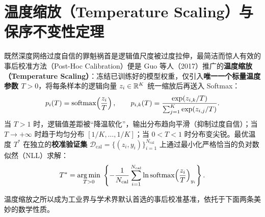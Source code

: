 \section{温度缩放（Temperature Scaling）与保序不变性定理}

既然深度网络过度自信的罪魁祸首是逻辑值尺度被过度拉伸，最简洁而惊人有效的事后校准方法（Post-Hoc Calibration）便是 Guo 等人（2017）推广的\textbf{温度缩放（Temperature Scaling）}：冻结已训练好的模型权重，仅引入\textbf{唯一一个标量温度参数 $T > 0$}，将每条样本的逻辑向量 $z_i \in \mathbb{R}^K$ 统一缩放后再送入 Softmax：
\begin{equation}\label{eq:temp-scaling}
  p_i(T) = \operatorname{softmax}\!\left(\frac{z_i}{T}\right),
  \qquad
  p_{i,k}(T) = \frac{\exp(z_{i,k} / T)}{\sum_{j=1}^K \exp(z_{i,j} / T)}.
\end{equation}
当 $T > 1$ 时，逻辑值差距被“降温软化”，输出分布趋向平滑（抑制过度自信）；当 $T \to +\infty$ 时趋于均匀分布 $[1/K,\dots,1/K]$；当 $0 < T < 1$ 时分布变尖锐。最优温度 $T^*$ 在独立的\textbf{校准验证集} $\mathcal{D}_{\text{cal}} = \{(z_i, y_i)\}_{i=1}^{N_{\text{cal}}}$ 上通过最小化严格恰当的负对数似然（NLL）求解：
\begin{equation}\label{eq:temp-opt}
  T^* = \operatorname*{arg\,min}_{T > 0}\; \left\{ -\frac{1}{N_{\text{cal}}} \sum_{i=1}^{N_{\text{cal}}} \ln \operatorname{softmax}\!\left(\frac{z_i}{T}\right)_{y_i} \right\}.
\end{equation}

温度缩放之所以成为工业界与学术界默认首选的事后校准基准，依托于下面两条美妙的数学性质。

